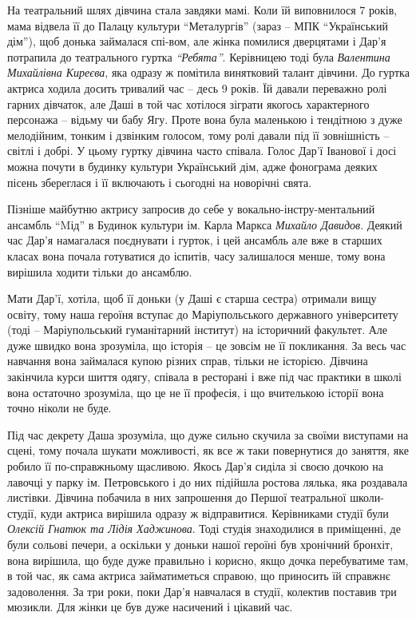 
На театральний шлях дівчина стала завдяки мамі. Коли їй виповнилося 7 років,
мама відвела її до Палацу культури \enquote{Металургів} (зараз – МПК \enquote{Український
дім}), щоб донька займалася спі\hyp{}вом, але жінка помилися дверцятами і Дар'я
потрапила до театрального гуртка \emph{\enquote{Ребята}}. Керівницею тоді була \emph{Валентина
Михайлівна Киреєва}, яка одразу ж помітила винятковий талант дівчини. До гуртка
актриса ходила досить тривалий час – десь 9 років. Їй давали переважно ролі
гарних дівчаток, але Даші в той час хотілося зіграти якогось характерного
персонажа – відьму чи бабу Ягу. Проте вона була маленькою і тендітною з дуже
мелодійним, тонким і дзвінким голосом, тому ролі давали під її зовнішність –
світлі і добрі. У цьому гуртку дівчина часто співала. Голос Дар'ї Іванової і
досі можна почути в будинку культури Український дім, адже фонограма деяких
пісень збереглася і її включають і сьогодні на новорічні свята.

Пізніше майбутню актрису запросив до себе у вокально-інстру\hyp{}ментальний ансамбль
\enquote{Mід} в Будинок культури ім. Карла Маркса \emph{Михайло Давидов}. Деякий час Дар'я
намагалася поєднувати і гурток, і цей ансамбль але вже в старших класах вона
почала готуватися до іспитів, часу залишалося менше, тому вона вирішила ходити
тільки до ансамблю.  

Мати Дар'ї, хотіла, щоб її доньки (у Даші є старша сестра) отримали вищу
освіту, тому наша героїня вступає до Маріупольського державного університету
(тоді – Маріупольський гуманітарний інститут) на історичний факультет. Але дуже
швидко вона зрозуміла, що історія – це зовсім не її покликання. За весь час
навчання вона займалася купою різних справ, тільки не історією. Дівчина
закінчила курси шиття одягу, співала в ресторані і вже під час практики в школі
вона остаточно зрозуміла, що це не її професія, і що вчителькою історії вона
точно ніколи не буде.


Під час декрету Даша зрозуміла, що дуже сильно скучила за своїми виступами на
сцені, тому почала шукати можливості, як все ж таки повернутися до заняття, яке
робило її по-справжньому щасливою. Якось Дар'я сиділа зі своєю дочкою на
лавочці у парку ім. Петровського і до них підійшла ростова лялька, яка
роздавала листівки. Дівчина побачила в них запрошення до Першої театральної
школи-студії, куди актриса вирішила одразу ж відправитися. Керівниками студії
були \emph{Олексій Гнатюк та Лідія Хаджинова}. Тоді студія знаходилися в приміщенні,
де були сольові печери, а оскільки у доньки нашої героїні був хронічний
бронхіт, вона вирішила, що буде дуже правильно і корисно, якщо дочка
перебуватиме там, в той час, як сама актриса займатиметься справою, що
приносить їй справжнє задоволення. За три роки, поки Дар'я навчалася в студії,
колектив поставив три мюзикли. Для жінки це був дуже насичений і цікавий час.


